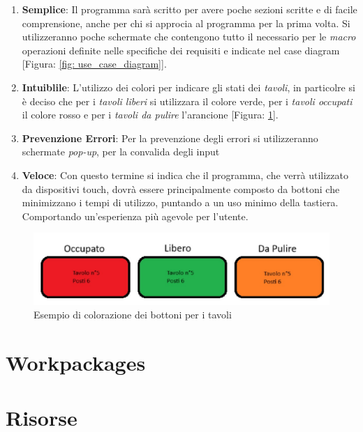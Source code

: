 \documentclass{book}
\begin{document}
\begin{enumerate}
    \item \textbf{Semplice}: Il programma sarà scritto per avere poche sezioni scritte e di facile comprensione, anche per chi si approcia al programma per la prima volta. Si utilizzeranno poche schermate che contengono tutto il necessario per le \textit{macro} operazioni definite nelle specifiche dei requisiti e indicate nel case diagram [Figura: \ref{fig: use_case_diagram}].
    \item \textbf{Intuiblile}: L'utilizzo dei colori per indicare gli stati dei \textit{tavoli}, in particolre si è deciso che per i \textit{tavoli liberi} si utilizzara il colore verde, per i \textit{tavoli occupati} il colore rosso e per i \textit{tavoli da pulire} l'arancione [Figura: \ref{fig: es_bottoni}].
    \item \textbf{Prevenzione Errori}: Per la prevenzione degli errori si utilizzeranno schermate \textit{pop-up}, per la convalida degli input
    \item \textbf{Veloce}: Con questo termine si indica che il programma, che verrà utilizzato da dispositivi touch, dovrà essere principalmente composto da bottoni che minimizzano i tempi di utilizzo, puntando a un uso minimo della tastiera. Comportando un'esperienza più agevole per l'utente.
\end{enumerate}

\begin{figure}[h]
    \centering
    \includegraphics[width=0.6\linewidth]{Esempio_Bottoni.jpg}
    \caption{Esempio di colorazione dei bottoni per i tavoli}
    \label{fig: es_bottoni}
\end{figure}


\section{Workpackages}

\section{Risorse}
\end{document}

